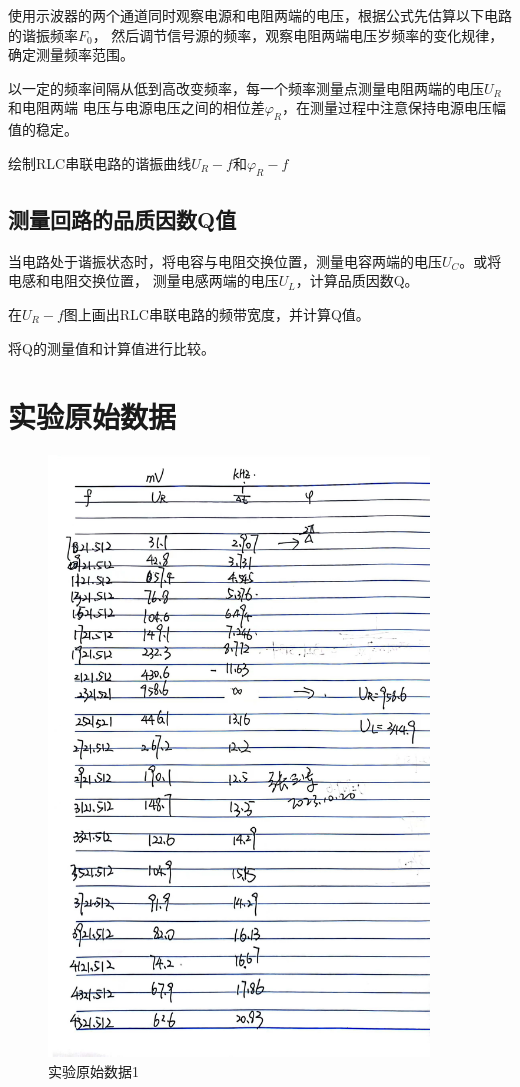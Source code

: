 \documentclass{ctexart}
\begin{document}
   使用示波器的两个通道同时观察电源和电阻两端的电压，根据公式先估算以下电路的谐振频率$F_{0}$，
              然后调节信号源的频率，观察电阻两端电压岁频率的变化规律，确定测量频率范围。

   以一定的频率间隔从低到高改变频率，每一个频率测量点测量电阻两端的电压$U_{R}$和电阻两端
              电压与电源电压之间的相位差$\varphi_{R}$，在测量过程中注意保持电源电压幅值的稳定。

   绘制RLC串联电路的谐振曲线$U_{R}-f\mbox{和}\varphi_{R}-f$

  \subsection{测量回路的品质因数Q值}
   当电路处于谐振状态时，将电容与电阻交换位置，测量电容两端的电压$U_{C}$。或将电感和电阻交换位置，
              测量电感两端的电压$U_{L}$，计算品质因数Q。

   在$U_{R}-f$图上画出RLC串联电路的频带宽度，并计算Q值。

   将Q的测量值和计算值进行比较。
\newpage

\section{实验原始数据}
\begin{figure}[H]
  \centering
  \includegraphics[width=0.9\textwidth,height=0.8\textheight]{yuanshishujv.jpg}
  \caption{实验原始数据1}
\end{figure}
\newpage
\end{document}

